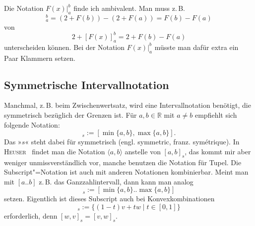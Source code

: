 \documentclass[a4paper,11pt,fleqn,twoside,BCOR=16mm]{scrartcl}
\newcommand{\R}{\mathbb R}
\newcommand{\citename}[1]{\textsc{#1}}
\begin{document}
Die Notation $F(x)|_a^b$ finde ich ambivalent. Man muss z.\,B.
\begin{equation}
[2+F(x)]_a^b = (2+F(b))-(2+F(a)) = F(b)-F(a)
\end{equation}
von
\begin{equation}
2+[F(x)]_a^b = 2+F(b)-F(a)
\end{equation}
unterscheiden können. Bei der Notation $F(x)|_a^b$ müsste
man dafür extra ein Paar Klammern setzen.

\subsection{Symmetrische Intervallnotation}
Manchmal, z.\,B. beim Zwischenwertsatz, wird eine
Intervallnotation benötigt, die symmetrisch bezüglich der Grenzen
ist. Für $a,b\in\R$ mit $a\ne b$ empfiehlt sich folgende Notation:
\begin{equation}
[a,b]_s := [\min\{a,b\},\max\{a,b\}].
\end{equation}
Das »$s$« steht dabei für symmetrisch (engl. symmetric,
franz. symétrique). In \citename{Heuser}~\cite{Heuser}\label{bref:Heuser}
findet man die Notation $\langle a,b\rangle$ anstelle von $[a,b]_s$,
das kommt mir aber weniger unmissverständlich vor, manche benutzen die
Notation für Tupel. Die Subscript"=Notation ist auch mit
anderen Notationen kombinierbar. Meint man mit $[a..b]$
z.\,B. das Ganzzahlintervall, dann kann man analog
\begin{equation}
[a..b]_s := [\min\{a,b\}..\max\{a,b\}]
\end{equation}
setzen. Eigentlich ist dieses Subscript auch bei Konvexkombinationen
\begin{equation}
[v,w]_s := \{(1-t)v+t w\mid t\in [0,1]\}
\end{equation}
erforderlich, denn $[w,v]_s=[v,w]_s$.
\end{document}
